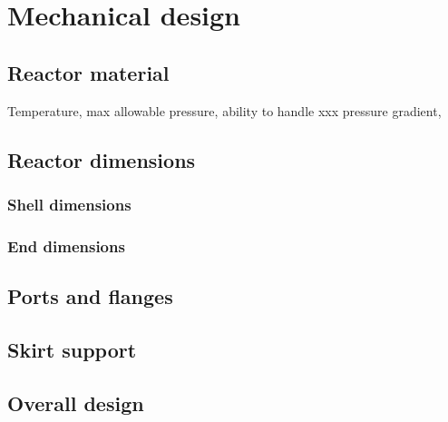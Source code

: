 \section{Mechanical design}
\subsection{Reactor material}
Temperature, max allowable pressure, ability to handle xxx pressure gradient, 

\subsection{Reactor dimensions}
\subsubsection{Shell dimensions}
\subsubsection{End dimensions}
\subsection{Ports and flanges}
\subsection{Skirt support}
\subsection{Overall design}

